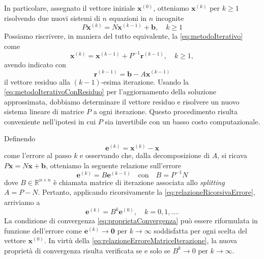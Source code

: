In particolare, assegnato il vettore iniziale $\mathbf{x}^{(0)}$, otteniamo $\mathbf{x}^{(k)}$ per $k\ge1$ risolvendo due nuovi sistemi di $n$ equazioni in $n$
incognite
\begin{equation}
    \label{eq:metodoIterativo}
    P\mathbf{x}^{(k)}=N\mathbf{x}^{(k-1)} + \mathbf{b},\quad k\ge1
\end{equation}
Possiamo riscrivere, in maniera del tutto equivalente, la \eqref{eq:metodoIterativo} come
\begin{equation}
    \label{eq:metodoIterativoConResiduo}
    \mathbf{x}^{(k)}=\mathbf{x}^{(k-1)} + P^{-1}\mathbf{r}^{(k-1)},\quad k\ge1,
\end{equation}
avendo indicato con
\[
    \mathbf{r}^{(k-1)}=\mathbf{b}-A\mathbf{x}^{(k-1)}
\]
il vettore residuo alla $(k-1)$-esima iterazione.\newline
Usando la \eqref{eq:metodoIterativoConResiduo} per l'aggiornamento della soluzione approssimata, dobbiamo determinare il vettore residuo e risolvere un nuovo sistema lineare di
matrice $P$ a ogni iterazione.\newline
Questo procedimento risulta conveniente nell'ipotesi in cui $P$ sia invertibile con un basso costo computazionale.

Definendo
\begin{equation}
    \mathbf{e}^{(k)} = \mathbf{x}^{(k)}-\mathbf{x}
\end{equation}
come l'errore al passo $k$ e osservando che, dalla decomposizione di $A$, si ricava $P\mathbf{x}= N\mathbf{x}+\mathbf{b}$, otteniamo la seguente relazione sull'errore
\begin{equation}
    \label{eq:relazioneRicorsivaErrore}
    \mathbf{e}^{(k)} = B\mathbf{e}^{(k-1)} \quad \text{con} \quad B = P^{-1}N
\end{equation}
dove $B\in\mathbb{R}^{n \times n}$ \`e chiamata matrice di iterazione associata allo \textit{splitting} $A = P - N$.
Pertanto, applicando ricorsivamente la \eqref{eq:relazioneRicorsivaErrore}, arriviamo a
\begin{equation}
    \label{eq:relazioneErroreMatriceIterazione}
    \mathbf{e}^{(k)}=B^{k}\mathbf{e}^{(0)},\quad k = 0, 1, \dots.
\end{equation}
La condizione di convergenza \eqref{eq:proprietaConvergenza} pu\`o essere riformulata in funzione dell'errore come
$\mathbf{e}^{(k)} \rightarrow \mathbf{0} \text{ per } k\rightarrow{\infty}$ soddisfatta per ogni scelta del vettore $\mathbf{x}^{(0)}$.\newline
In virt\`u della \eqref{eq:relazioneErroreMatriceIterazione}, la nuova propriet\`a di convergenza risulta verificata se e solo se ${B}^{k} \rightarrow 0 \text{ per } k\rightarrow{\infty}$.


